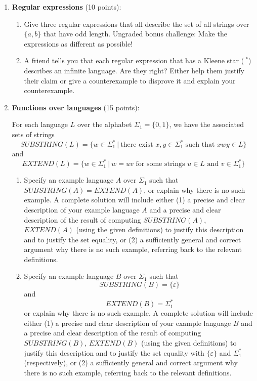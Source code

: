 \begin{enumerate}[wide, labelwidth=!, labelindent=0pt]
\item\textbf{Regular expressions} (10 points):

    \begin{enumerate}
    \item\gradeComplete  Give three regular expressions that all describe the set of all strings over $\{a,b\}$ that have 
    odd length. Ungraded bonus challenge: Make the expressions as different as possible!

    \item\gradeComplete  A friend tells you that each regular expression that has a Kleene star ($~^*$) describes an
    infinite language. Are they right? Either help them justify their claim or give a counterexample to disprove it
    and explain your counterexample.

    \end{enumerate}

\item\textbf{Functions over languages} (15 points):

For each language $L$ over the alphabet $\Sigma_1 = \{0,1\}$, we have the 
associated sets of strings
\[
    SUBSTRING(L) = \{ w \in \Sigma_1^* ~|~ \text{there exist } x,y \in \Sigma_1^* \text{ such that } xwy \in L\}
\]
and 
\[
    EXTEND(L) = \{ w \in \Sigma_1^* ~|~ w = uv \text{ for some strings } u \in L \text{ and } v \in \Sigma_1^* \}
\]
    \begin{enumerate}
    \item\gradeComplete Specify an example language $A$ over $\Sigma_1$ such that 
    $SUBSTRING(A) = EXTEND(A)$, 
    or explain why there is no such example. 
    A complete solution will include either (1) a precise and
    clear description of your example language $A$ 
    and a precise and clear description of
    the result of computing $SUBSTRING(A)$, $EXTEND(A)$ (using the given definitions)
    to justify this description and to justify the set equality,
    or (2) a sufficiently general and correct argument
    why there is no such example, referring back to the relevant definitions.

    \item\gradeCorrect Specify an example language $B$ over $\Sigma_1$ such that 
    $$SUBSTRING(B) = \{\varepsilon\}$$ and $$EXTEND(B) = \Sigma_1^*$$
    or explain why there is no such example. 
    A complete solution will include either (1) a precise and
    clear description of your example language $B$ 
    and a precise and clear description of
    the result of computing $SUBSTRING(B)$, $EXTEND(B)$ (using the given definitions)
    to justify this description and to justify the set equality with 
    $\{\varepsilon\}$ and $\Sigma_1^*$ (respectively), or (2) a sufficiently general and correct argument
    why there is no such example, referring back to the relevant definitions.


\end{enumerate}
\end{enumerate}
